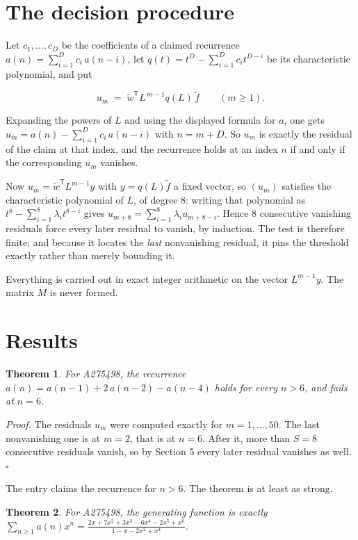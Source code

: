 \documentclass[11pt]{article}
\newtheorem{theorem}{Theorem}
\theoremstyle{definition}
\begin{document}
\section{The decision procedure}

Let $c_1,\dots,c_D$ be the coefficients of a claimed recurrence $a(n) = \sum_{i=1}^{D} c_i\,a(n-i)$, let $q(t) = t^{D} - \sum_{i=1}^{D} c_i t^{D-i}$ be its characteristic polynomial, and put

\[u_m \;=\; \tilde w^{\mathsf T} L^{\,m-1} q(L)\,\tilde f \qquad (m \ge 1).\]

Expanding the powers of $L$ and using the displayed formula for $a$, one gets $u_m = a(n) - \sum_{i=1}^{D} c_i\,a(n-i)$ with $n = m + D$. So $u_m$ is exactly the residual of the claim at that index, and the recurrence holds at an index $n$ if and only if the corresponding $u_m$ vanishes.

Now $u_m = \tilde w^{\mathsf T} L^{m-1} y$ with $y = q(L)\tilde f$ a fixed vector, so $(u_m)$ satisfies the characteristic polynomial of $L$, of degree $8$: writing that polynomial as $t^{8} - \sum_{i=1}^{8} \lambda_i t^{8-i}$ gives $u_{m+8} = \sum_{i=1}^{8} \lambda_i u_{m+8-i}$. Hence $8$ consecutive vanishing residuals force every later residual to vanish, by induction. The test is therefore finite; and because it locates the {\itshape last} nonvanishing residual, it pins the threshold exactly rather than merely bounding it.

Everything is carried out in exact integer arithmetic on the vector $L^{m-1}y$. The matrix $M$ is never formed.

\section{Results}

\begin{theorem} For A275498, the recurrence $a(n) = a(n-1) + 2\,a(n-2) - a(n-4)$ holds for every $n > 6$, and fails at $n = 6$.\end{theorem}

{\itshape Proof.} The residuals $u_m$ were computed exactly for $m = 1,\dots,50$. The last nonvanishing one is at $m = 2$, that is at $n = 6$. After it, more than $S = 8$ consecutive residuals vanish, so by Section 5 every later residual vanishes as well. $\square$

The entry claims the recurrence for $n > 6$. The theorem is at least as strong.

\begin{theorem} For A275498, the generating function is exactly $\sum_{n\ge 1} a(n)x^n = \frac{2x + 7x^{2} + 3x^{3} - 6x^{4} - 2x^{5} + x^{6}}{1 - x - 2x^{2} + x^{4}}$.\end{theorem}
\end{document}
